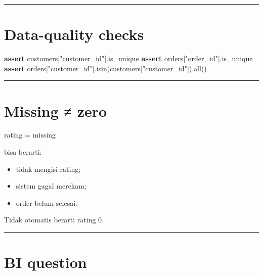 \documentclass[
  indonesian,
  letterpaper,
  DIV=11,
  numbers=noendperiod]{scrreprt}
\newenvironment{Shaded}{\begin{snugshade}}{\end{snugshade}}
\newcommand{\BuiltInTok}[1]{\textcolor[rgb]{0.00,0.23,0.31}{#1}}
\newcommand{\ControlFlowTok}[1]{\textcolor[rgb]{0.00,0.23,0.31}{\textbf{#1}}}
\newcommand{\NormalTok}[1]{\textcolor[rgb]{0.00,0.23,0.31}{#1}}
\newcommand{\StringTok}[1]{\textcolor[rgb]{0.13,0.47,0.30}{#1}}
\providecommand{\tightlist}{%
  \setlength{\itemsep}{0pt}\setlength{\parskip}{0pt}}
\begin{document}
\begin{center}\rule{0.5\linewidth}{0.5pt}\end{center}

\section{Data-quality checks}\label{data-quality-checks}

\begin{Shaded}
\begin{Highlighting}[]
\ControlFlowTok{assert}\NormalTok{ customers[}\StringTok{"customer\_id"}\NormalTok{].is\_unique}
\ControlFlowTok{assert}\NormalTok{ orders[}\StringTok{"order\_id"}\NormalTok{].is\_unique}
\ControlFlowTok{assert}\NormalTok{ orders[}\StringTok{"customer\_id"}\NormalTok{].isin(customers[}\StringTok{"customer\_id"}\NormalTok{]).}\BuiltInTok{all}\NormalTok{()}
\end{Highlighting}
\end{Shaded}

\begin{center}\rule{0.5\linewidth}{0.5pt}\end{center}

\section{Missing ≠ zero}\label{missing-zero}

\begin{Shaded}
\begin{Highlighting}[]
\NormalTok{rating = missing}
\end{Highlighting}
\end{Shaded}

bisa berarti:

\begin{itemize}
\tightlist
\item
  tidak mengisi rating;
\item
  sistem gagal merekam;
\item
  order belum selesai.
\end{itemize}

Tidak otomatis berarti rating 0.

\begin{center}\rule{0.5\linewidth}{0.5pt}\end{center}

\section{BI question}\label{bi-question}
\end{document}

